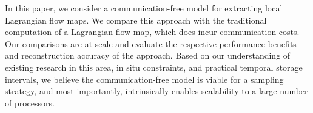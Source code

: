 In this paper, we consider a communication-free model for extracting local Lagrangian flow maps. 
%
We compare this approach with the traditional computation of a Lagrangian flow map, which does incur communication costs.
%
Our comparisons are at scale and evaluate the respective performance benefits and reconstruction accuracy of the approach.
%
Based on our understanding of existing research in this area, in situ constraints, and practical temporal storage intervals, we believe the communication-free model is viable for a sampling strategy, and most importantly, intrinsically enables scalability to a large number of processors.

